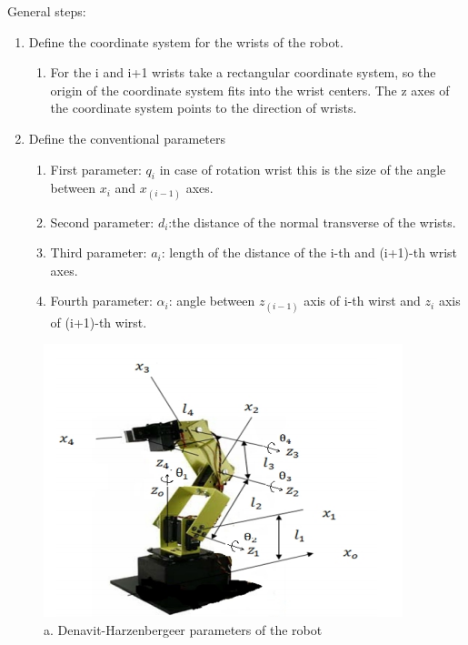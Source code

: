 General steps:
	\begin{enumerate}
			\item Define the coordinate system for the wrists of the robot.\\
			\begin{enumerate}
				\item For the i and i+1 wrists take a rectangular coordinate system, so the origin of the coordinate system fits into the wrist centers. The z axes of the coordinate system points to the direction of wrists. \\
			\end{enumerate}
			\item Define the conventional parameters \\
			
			\begin{enumerate}
				\item First parameter: $q_i$ in case of rotation wrist this is the size of the angle between $x_i$ and $x_(i-1)$ axes. \\
				\item Second parameter: $d_i$:the distance of the normal transverse of the wrists. \\
				\item Third parameter: $a_i$: length of the distance of the i-th and (i+1)-th wrist axes. \\
				\item Fourth parameter:  $\alpha _i$: angle between $z_(i-1)$ axis of i-th wirst and $z_i$ axis of (i+1)-th  wirst. \\
			\end{enumerate}
		\end{enumerate}
		
		\begin{figure}[H]
			\centering
			\includegraphics[]{./images/denavit_parameters}
			\caption{a. Denavit-Harzenbergeer parameters of the robot}
		\end{figure}
		
